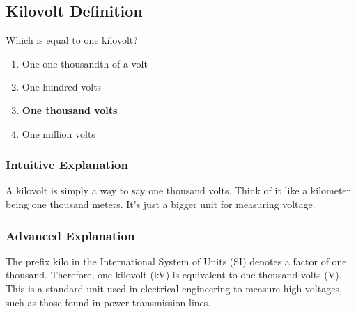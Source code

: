 \subsection{Kilovolt Definition}\label{T5B03}

\begin{tcolorbox}[colback=gray!10!white,colframe=black!75!black,title=T5B03]
Which is equal to one kilovolt?
\begin{enumerate}[noitemsep]
    \item One one-thousandth of a volt
    \item One hundred volts
    \item \textbf{One thousand volts}
    \item One million volts
\end{enumerate}
\end{tcolorbox}

\subsubsection*{Intuitive Explanation}
A kilovolt is simply a way to say one thousand volts. Think of it like a kilometer being one thousand meters. It's just a bigger unit for measuring voltage.

\subsubsection*{Advanced Explanation}
The prefix kilo in the International System of Units (SI) denotes a factor of one thousand. Therefore, one kilovolt (kV) is equivalent to one thousand volts (V). This is a standard unit used in electrical engineering to measure high voltages, such as those found in power transmission lines.